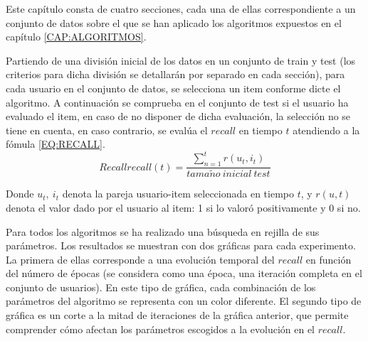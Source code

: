 Este capítulo consta de cuatro secciones, cada una de ellas correspondiente a un conjunto de datos sobre el que se han aplicado los algoritmos expuestos en el capítulo \ref{CAP:ALGORITMOS}. 

Partiendo de una división inicial de los datos en un conjunto de train y test (los criterios para dicha división se detallarán por separado en cada sección), para cada usuario en el conjunto de datos, se selecciona un item conforme dicte el algoritmo. A continuación se comprueba en el conjunto de test si el usuario ha evaluado el item, en caso de no disponer de dicha evaluación, la selección no se tiene en cuenta, en caso contrario, se evalúa el $recall$ en tiempo $t$ atendiendo a la fómula \ref{EQ:RECALL}.
\begin{equation} [EQ:RECALL]{Recall}
    recall(t) = \dfrac{\sum_{n=1}^{t} r(u_{t}, i_{t})}{tama\tilde{n}o \ inicial \ test}
\end{equation}


Donde $u_{t}, \ i_{t}$ denota la pareja usuario-item seleccionada en tiempo $t$, y $r(u, t)$ denota el valor dado por el usuario al item: 1 si lo valoró positivamente y 0 si no.

Para todos los algoritmos se ha realizado una búsqueda en rejilla de sus parámetros. Los resultados se muestran con dos gráficas para cada experimento. La primera de ellas corresponde a una evolución temporal del $recall$ en función del número de épocas (se considera como una época, una iteración completa en el conjunto de usuarios). En este tipo de gráfica, cada combinación de los parámetros del algoritmo se representa con un color diferente.  El segundo tipo de gráfica es un corte a la mitad de iteraciones de la gráfica anterior, que permite comprender cómo afectan los parámetros escogidos a la evolución en el $recall$.
